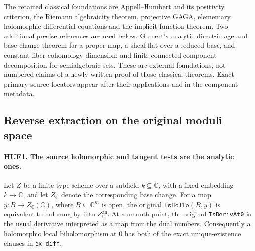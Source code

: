 The retained classical foundations are Appell--Humbert and its
positivity criterion, the Riemann algebraicity theorem, projective
GAGA, elementary holomorphic differential equations and the
implicit-function theorem.  Two additional precise references are
used below: Grauert's analytic direct-image and base-change theorem
for a proper map, a sheaf flat over a reduced base, and constant
fiber cohomology dimension; and finite connected-component
decomposition for semialgebraic sets.  These are external foundations,
not numbered claims of a newly written proof of those classical
theorems.  Exact primary-source locators appear after their applications
and in the component metadata.

\subsection{Reverse extraction on the original moduli space}

\paragraph{HUF1. The source holomorphic and tangent tests are the analytic ones.}
\label{claim:HUF1}
Let \(Z\) be a finite-type scheme over a subfield \(k\subseteq\mathbb C\),
with a fixed embedding \(k\to\mathbb C\), and let
\(Z_\mathbb C\) denote the corresponding base change.
For a map \(y:B\to Z_\mathbb C(\mathbb C)\), where
\(B\subseteq\mathbb C^m\) is open, the original
\(\texttt{IsHolTo}(B,y)\) is equivalent to holomorphy into
\(Z_\mathbb C^{\mathrm{an}}\).
At a smooth point, the original \texttt{IsDerivAt0} is the
usual derivative interpreted as a map from the dual numbers.
Consequently a holomorphic local biholomorphism at \(0\) has
both of the exact unique-existence clauses in \texttt{ex\_diff}.

